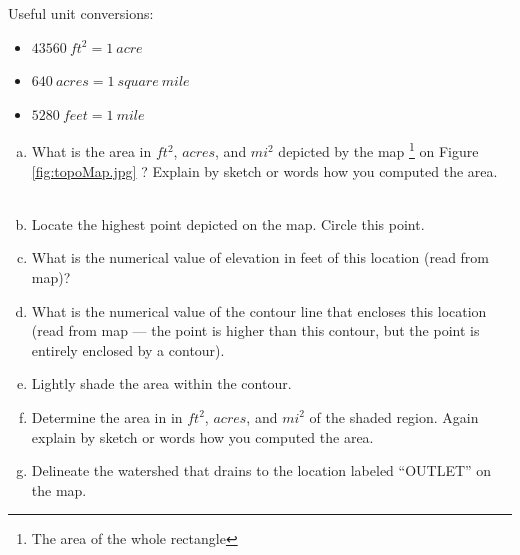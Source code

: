 \documentclass[12pt]{article}
\begin{document}
\begin{enumerate}
Useful unit conversions:
\begin{itemize}
\item $43560~ ft^2 = 1 ~acre$
\item $640 ~acres = 1 ~square~mile$
\item $5280 ~feet = 1 ~mile$
\end{itemize}
\clearpage
\begin{enumerate}[a)]
\item What is the area in $ft^2$, $acres$, and $mi^2$ depicted by the map \footnote{The area of the whole rectangle} on Figure \ref{fig:topoMap.jpg} ?  Explain by sketch or words how you computed the area. 
~\newline
~\newline
~\newline
~\newline
~\newline
~\newline
~\newline
~\newline
\item Locate the highest point depicted on the map.  Circle this point. 
\item What is the numerical value of elevation in feet of this location (read from map)?
~\newline
~\newline
~\newline
~\newline
\item What is the numerical value of the contour line that encloses this location (read from map --- the point is higher than this contour, but the point is entirely enclosed by a contour).
~\newline
~\newline
~\newline
~\newline
\item Lightly shade the area within the contour.  
\item Determine the area in in $ft^2$, $acres$, and $mi^2$ of the shaded region.  Again explain by sketch or words how you computed the area.
~\newline
~\newline
~\newline
~\newline
~\newline
~\newline
~\newline
~\newline
\clearpage
\item Delineate the watershed that drains to the location labeled ``OUTLET'' on the map.
~\newline


\end{enumerate}
\end{enumerate}
\end{document}
